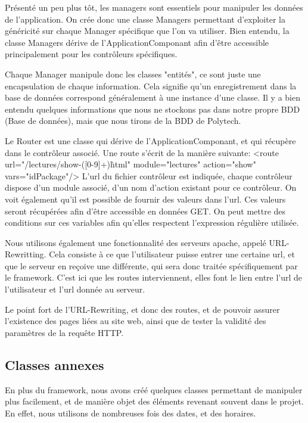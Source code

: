 Présenté un peu plus tôt, les managers sont essentiels pour manipuler les données de l'application. On crée donc une classe
Managers permettant d'exploiter la généricité sur chaque Manager spécifique que l'on va utiliser. Bien entendu, la classe
Managers dérive de l'ApplicationComponant afin d'être accessible principalement pour les contrôleurs spécifiques.

Chaque Manager manipule donc les classes "entités", ce sont juste une encapsulation de chaque information. Cela signifie
qu'un enregistrement dans la base de données correspond généralement à une instance d'une classe. Il y a bien entendu quelques
informations que nous ne stockons pas dans notre propre BDD (Base de données), mais que nous tirons de la BDD de Polytech.

Le Router est une classe qui dérive de l'ApplicationComponant, et qui récupère dans le contrôleur associé.
Une route s'écrit de la manière suivante:
<route url="/lectures/show-([0-9]+)\.html" module="lectures" action="show" vars="idPackage"/>
L'url du fichier contrôleur est indiquée, chaque contrôleur dispose d'un module associé, d'un nom d'action existant pour ce
contrôleur. On voit également qu'il est possible de fournir des valeurs dans l'url. Ces valeurs seront récupérées afin
d'être accessible en données GET. On peut mettre des conditions sur ces variables afin qu'elles respectent l'expression régulière
utilisée.

Nous utilisons également une fonctionnalité des serveurs apache, appelé URL-Rewritting. Cela consiste à ce que l'utilisateur
puisse entrer une certaine url, et que le serveur en reçoive une différente, qui sera donc traitée spécifiquement par le framework.
C'est ici que les routes interviennent, elles font le lien entre l'url de l'utilisateur et l'url donnée au serveur.

Le point fort de l'URL-Rewriting, et donc des routes, et de pouvoir assurer l'existence des pages liées au site web,
ainsi que de tester la validité des paramètres de la requête HTTP.

        \subsection{Classes annexes}

En plus du framework, nous avons créé quelques classes permettant de manipuler plus facilement, et de manière objet
des éléments revenant souvent dans le projet. En effet, nous utilisons de nombreuses fois des dates, et des horaires.

